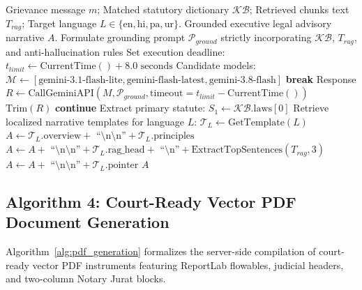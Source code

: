 \begin{algorithm}[H]
\caption{Hybrid Grounded Legal Synthesis with Multi-Model Failover}
\label{alg:hybrid_synthesis}
\begin{algorithmic}[1]
\Require Grievance message $m$; Matched statutory dictionary $\mathcal{KB}$; Retrieved chunks text $T_{rag}$; Target language $L \in \{\text{en}, \text{hi}, \text{pa}, \text{ur}\}$.
\Ensure Grounded executive legal advisory narrative $A$.
    \State Formulate grounding prompt $\mathcal{P}_{ground}$ strictly incorporating $\mathcal{KB}$, $T_{rag}$, and anti-hallucination rules
    \State Set execution deadline: $t_{limit} \leftarrow \text{CurrentTime}() + 8.0\text{ seconds}$
    \State Candidate models: $\mathcal{M} \leftarrow [\text{gemini-3.1-flash-lite}, \text{gemini-flash-latest}, \text{gemini-3.8-flash}]$
            \State \textbf{break}
        \EndIf
        \Try
            \State Response $R \leftarrow \text{CallGeminiAPI}(M, \mathcal{P}_{ground}, \text{timeout}=t_{limit} - \text{CurrentTime}())$
                \State \Return $\text{Trim}(R)$ 
            \EndIf
        \Catch
            \State \textbf{continue} 
        \EndTry
    \EndFor
\EndIf
\State {}
\State Extract primary statute: $S_1 \leftarrow \mathcal{KB}.\text{laws}[0]$
\State Retrieve localized narrative templates for language $L$: $\mathcal{T}_L \leftarrow \text{GetTemplate}(L)$
\State $A \leftarrow \mathcal{T}_L.\text{overview} + \text{ ``\textbackslash n\textbackslash n''} + \mathcal{T}_L.\text{principles}$
    \State $A \leftarrow A + \text{ ``\textbackslash n\textbackslash n''} + \mathcal{T}_L.\text{rag\_head} + \text{ ``\textbackslash n''} + \text{ExtractTopSentences}(T_{rag}, 3)$
\EndIf
\State $A \leftarrow A + \text{ ``\textbackslash n\textbackslash n''} + \mathcal{T}_L.\text{pointer}$
\State \Return $A$
\end{algorithmic}
\end{algorithm}

\subsection{Algorithm 4: Court-Ready Vector PDF Document Generation}
Algorithm~\ref{alg:pdf_generation} formalizes the server-side compilation of court-ready vector PDF instruments featuring ReportLab flowables, judicial headers, and two-column Notary Jurat blocks.

